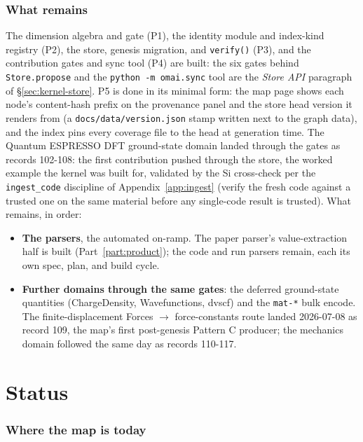 \documentclass[11pt,a4paper]{article}
\begin{document}
\section{What remains}
\label{sec:kernel-remaining}

The dimension algebra and gate (P1), the identity module and index-kind registry
(P2), the store, genesis migration, and \texttt{verify()} (P3), and the
contribution gates and sync tool (P4) are built: the six gates behind
\texttt{Store.propose} and the \texttt{python -m omai.sync} tool are the
\emph{Store API} paragraph of \S\ref{sec:kernel-store}. P5 is done in its minimal form: the map page shows
each node's content-hash prefix on the provenance panel and the store head
version it renders from (a \texttt{docs/data/version.json} stamp written next to
the graph data), and the index pins every coverage file to the head at
generation time. The Quantum ESPRESSO DFT ground-state domain landed through the
gates as records 102-108: the first contribution pushed through the store, the
worked example the kernel was built for, validated by the Si cross-check per the
\texttt{ingest\_code} discipline of Appendix~\ref{app:ingest} (verify the fresh
code against a trusted one on the same material before any single-code result is
trusted). What remains, in order:
\begin{itemize}[leftmargin=2em, itemsep=0.2em]
  \item \textbf{The parsers}, the automated on-ramp. The paper parser's
        value-extraction half is built (Part~\ref{part:product}); the code and run
        parsers remain, each its own spec, plan, and build cycle.
  \item \textbf{Further domains through the same gates}: the deferred
        ground-state quantities (ChargeDensity, Wavefunctions, dvscf) and the
        \texttt{mat-*} bulk encode. The finite-displacement Forces $\to$
        force-constants route landed 2026-07-08 as record 109, the map's
        first post-genesis Pattern C producer; the mechanics domain followed
        the same day as records 110-117.
\end{itemize}

\part{Status}
\label{part:status}

\section{Where the map is today}
\label{sec:status-live}
\end{document}
